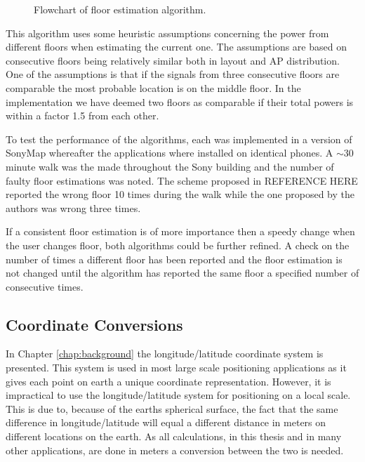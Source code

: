 \documentclass{LTHthesis}
\begin{document}
\begin{figure}
  \caption{Flowchart of floor estimation algorithm. } \label{flowchart}
\end{figure}

This algorithm uses some heuristic assumptions concerning the power from different floors when estimating the current one. The assumptions are based on consecutive floors being relatively similar both in layout and AP distribution. One of the assumptions is that if the signals from three consecutive floors are comparable the most probable location is on the middle floor. In the implementation we have deemed two floors as comparable if their total powers is within a factor 1.5 from each other.  

To test the performance of the algorithms, each was implemented in a version of SonyMap whereafter the applications where installed on identical phones. A $\sim$30 minute walk was the made throughout the Sony building and the number of faulty floor estimations was noted. The scheme proposed in REFERENCE HERE reported the wrong floor 10 times during the walk while the one proposed by the authors was wrong three times. 

If a consistent floor estimation is of more importance then a speedy change when the user changes floor, both algorithms could be further refined. A check on the number of times a different floor has been reported and the floor estimation is not changed until the algorithm has reported the same floor a specified number of consecutive times.    

%
\subsection{Coordinate Conversions}
In Chapter \ref{chap:background} the longitude/latitude coordinate system is presented. This system is used in most large scale positioning applications as it gives each point on earth a unique coordinate representation. However, it is impractical to use the longitude/latitude system for positioning on a local scale. This is due to, because of the earths spherical surface, the fact that the same difference in longitude/latitude will equal a different distance in meters on different locations on the earth. As all calculations, in this thesis and in many other applications, are done in meters a conversion between the two is needed. 
\end{document}
